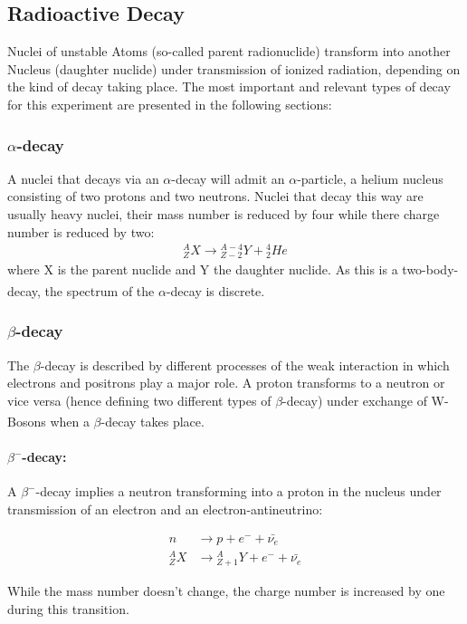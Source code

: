 \documentclass[12pt]{article}
\begin{document}
\subsection{Radioactive Decay}
Nuclei of unstable Atoms (so-called parent radionuclide) transform into another Nucleus (daughter nuclide) under transmission of ionized radiation, depending on the kind of decay taking place. The most important and relevant types of decay for this experiment are presented in the following sections:

\subsubsection{$\alpha$-decay \label{alpha}}

A nuclei that decays via an $\alpha$-decay will admit an $\alpha$-particle, a helium nucleus consisting of two protons and two neutrons. Nuclei that decay this way are usually heavy nuclei, their mass number is reduced by four while there charge number is reduced by two:
\begin{align}
{}_Z^A X \rightarrow {}_{Z-2}^{A-4} Y + {}^4_2He
\end{align}
where X is the parent nuclide and Y the daughter nuclide. As this is a  two-body-decay, the spectrum of the $\alpha$-decay is discrete. \textsuperscript{\cite{dem}}
\subsubsection{$\beta$-decay \label{beta}}
The $\beta$-decay is described by different processes of the weak interaction
in which electrons and positrons play a major role. A proton transforms to a neutron or vice versa (hence defining two different types of $\beta$-decay) under exchange of W-Bosons when a $\beta$-decay takes place. \textsuperscript{\cite{dem}}


\paragraph*{$\beta^-$-decay:} 
A $\beta^-$-decay implies a neutron transforming into a proton in the nucleus under transmission of an electron and an electron-antineutrino:

\begin{align*}
n &\rightarrow p + e^- + \bar{\nu_e}\\
{}_Z^A X &\rightarrow {}_{Z+1}^A Y + e^- + \bar{\nu_e}
\end{align*}

While the mass number doesn't change, the charge number is increased by one during this transition.
\end{document}

